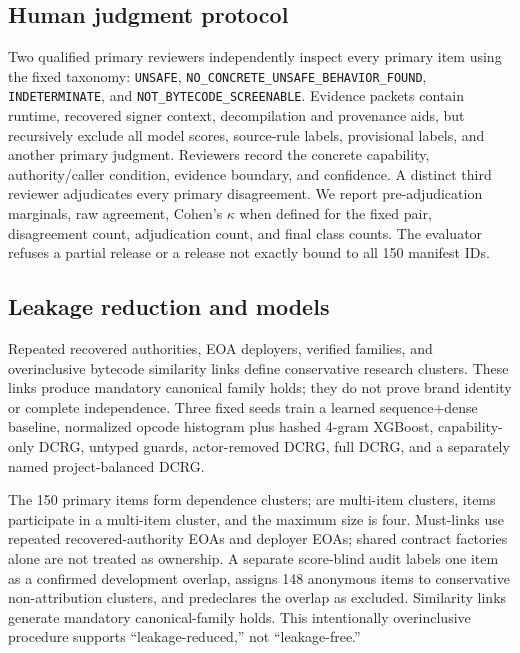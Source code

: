 \documentclass[conference]{IEEEtran}
\newcommand{\code}[1]{\texttt{#1}}
\begin{document}
\subsection{Human judgment protocol}

Two qualified primary reviewers independently inspect every primary item using the fixed taxonomy:
\code{UNSAFE}, \code{NO\_CONCRETE\_UNSAFE\_BEHAVIOR\_FOUND}, \code{INDETERMINATE}, and
\code{NOT\_BYTECODE\_SCREENABLE}. Evidence packets contain runtime, recovered signer context,
decompilation and provenance aids, but recursively exclude all model scores, source-rule labels,
provisional labels, and another primary judgment. Reviewers record the concrete capability,
authority/caller condition, evidence boundary, and confidence. A distinct third reviewer
adjudicates every primary disagreement. We report pre-adjudication marginals, raw agreement,
Cohen's $\kappa$ when defined for the fixed pair, disagreement count, adjudication count, and final
class counts. The evaluator refuses a partial release or a release not exactly bound to all 150
manifest IDs.

\subsection{Leakage reduction and models}

Repeated recovered authorities, EOA deployers, verified families, and overinclusive bytecode
similarity links define conservative research clusters. These links produce mandatory canonical
family holds; they do not prove brand identity or complete independence. Three fixed seeds train a
learned sequence+dense baseline, normalized opcode histogram plus hashed 4-gram XGBoost,
capability-only DCRG, untyped guards, actor-removed DCRG, full DCRG, and a separately named
project-balanced DCRG.

The 150 primary items form \DependenceClusters{} dependence clusters;
\DependenceMultiClusters{} are multi-item clusters, \DependenceMultiItems{} items participate
in a multi-item cluster, and the maximum size is four. Must-links use repeated recovered-authority
EOAs and deployer EOAs; shared contract factories alone are not treated as ownership. A separate
score-blind audit labels one item as a confirmed development overlap, assigns 148 anonymous items
to conservative non-attribution clusters, and predeclares the overlap as excluded. Similarity links
generate \HeldCanonicalFamilies{} mandatory canonical-family holds. This intentionally
overinclusive procedure supports
``leakage-reduced,'' not ``leakage-free.''
\end{document}

